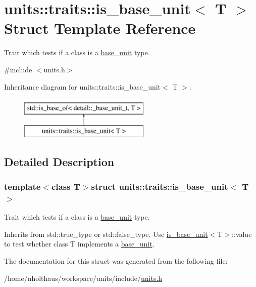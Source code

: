 \hypertarget{structunits_1_1traits_1_1is__base__unit}{}\section{units\+:\+:traits\+:\+:is\+\_\+base\+\_\+unit$<$ T $>$ Struct Template Reference}
\label{structunits_1_1traits_1_1is__base__unit}


Trait which tests if a class is a {\ttfamily \hyperlink{structunits_1_1base__unit}{base\+\_\+unit}} type.  




{\ttfamily \#include $<$units.\+h$>$}

Inheritance diagram for units\+:\+:traits\+:\+:is\+\_\+base\+\_\+unit$<$ T $>$\+:\begin{figure}[H]
\begin{center}
\leavevmode
\includegraphics[height=2.000000cm]{structunits_1_1traits_1_1is__base__unit}
\end{center}
\end{figure}


\subsection{Detailed Description}
\subsubsection*{template$<$class T$>$struct units\+::traits\+::is\+\_\+base\+\_\+unit$<$ T $>$}

Trait which tests if a class is a {\ttfamily \hyperlink{structunits_1_1base__unit}{base\+\_\+unit}} type. 

Inherits from {\ttfamily std\+::true\+\_\+type} or {\ttfamily std\+::false\+\_\+type}. Use {\ttfamily \hyperlink{structunits_1_1traits_1_1is__base__unit}{is\+\_\+base\+\_\+unit}$<$T$>$\+::value} to test whether {\ttfamily class T} implements a {\ttfamily \hyperlink{structunits_1_1base__unit}{base\+\_\+unit}}. 

The documentation for this struct was generated from the following file\+:\begin{DoxyCompactItemize}
\item 
/home/nholthaus/workspace/units/include/\hyperlink{units_8h}{units.\+h}\end{DoxyCompactItemize}
